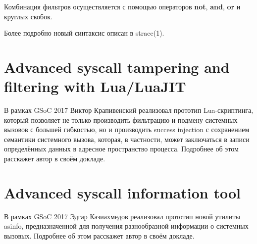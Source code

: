 Комбинация фильтров осуществляется с помощью операторов
\textbf{not}, \textbf{and}, \textbf{or} и круглых скобок.

Более подробно новый синтаксис описан в strace(1).

\section{Advanced syscall tampering and filtering with Lua/LuaJIT}
В рамках GSoC 2017 Виктор Крапивенский реализовал прототип Lua-скриптинга,
который позволяет не только производить фильтрацию и подмену системных вызовов
с большей гибкостью, но и производить success injection с сохранением семантики
системного вызова, которая, в частности, может заключаться в записи
определённых данных в адресное пространство процесса.
Подробнее об этом расскажет автор в своём докладе.

\section{Advanced syscall information tool}
В рамках GSoC 2017 Эдгар Казиахмедов реализовал прототип новой утилиты asinfo,
предназначенной для получения разнообразной информации о системных вызовых.
Подробнее об этом расскажет автор в своём докладе.
